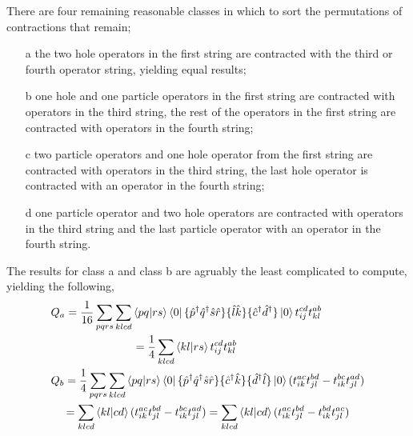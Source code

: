 There are four remaining reasonable classes in which to sort the
permutations of contractions that remain;
\begin{itemize}
    \item[a] the two hole operators in the first string are
    contracted with the third or fourth operator string, yielding 
    equal results;
    \item[b] one hole and one particle operators in the first string
    are contracted with operators in the third string, the rest of
    the operators in the first string are contracted with operators 
    in the fourth string;
    \item[c] two particle operators and one hole operator from the 
    first string are contracted with operators in the third string,
    the last hole operator is contracted with an operator in the 
    fourth string;
   \item[d] one particle operator and two hole operators are contracted 
    with operators in the third string and the last particle operator 
    with an operator in the fourth string.
\end{itemize}
The results for class a and class b are agruably the least complicated to 
compute, yielding the following,
\begin{align}
    &\begin{gathered}
        Q_a = \frac{1}{16}\sum_{pqrs}\sum_{klcd} 
        \bra{pq} \ket{rs}\bra{0}
            \{\hat{p}^\dagger \hat{q}^\dagger \hat{s} \hat{r} \}
            \{\hat{l} \hat{k} \}
            \{\hat{c}^\dagger \hat{d}^\dagger \}
        \ket{0} t^{cd}_{ij} t^{ab}_{kl} \\
        = \frac{1}{4} \sum_{klcd}
        \bra{kl} \ket{rs} t^{cd}_{ij} t^{ab}_{kl}
    \end{gathered} \\
    &\begin{gathered}
        Q_b = \frac{1}{4}\sum_{pqrs} \sum_{klcd}
        \bra{pq} \ket{rs} \bra{0}
            \{\hat{p}^\dagger \hat{q}^\dagger \hat{s} \hat{r} \}
            \{\hat{c}^\dagger \hat{k} \}
            \{\hat{d}^\dagger \hat{l} \}
            \ket{0}
            (t^{ac}_{ik}t^{bd}_{jl} - t^{bc}_{ik}t^{ad}_{jl}) \\
        = \sum_{klcd} \bra{kl} \ket{cd}
            (t^{ac}_{ik}t^{bd}_{jl} - t^{bc}_{ik}t^{ad}_{jl})
        = \sum_{klcd} \bra{kl} \ket{cd}
            (t^{ac}_{ik}t^{bd}_{jl} - t^{bd}_{ik}t^{ac}_{jl})
    \end{gathered}
\end{align}

